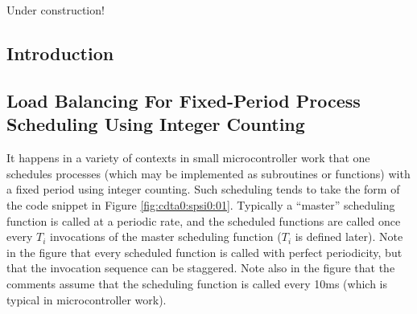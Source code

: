 \chapter[\cdtazeroshorttitle{}]{\cdtazerolongtitle{}}

\label{cdta0}

                     {Under construction!}


\section{Introduction}
\label{cdta0:sint0}


\section[Fixed-Period Process Scheduling]
        {Load Balancing For Fixed-Period Process Scheduling Using Integer Counting}
\label{cdta0:spsi0}

It happens in a variety of 
contexts in small microcontroller work
that one schedules processes (which may be implemented as subroutines
or functions) with a fixed period
using integer counting.  Such scheduling tends to take the form of
the code snippet in  
Figure \ref{fig:cdta0:spsi0:01}.  Typically a ``master'' scheduling function
is called at a periodic rate, and the scheduled functions are called
once every $T_i$ invocations of the master scheduling function ($T_i$ is
defined later).  Note in the figure that every scheduled function
is called with perfect periodicity, but that the invocation sequence
can be staggered.  Note also in the figure that the comments assume
that the scheduling function is called every 10ms (which is typical in
microcontroller work). 


